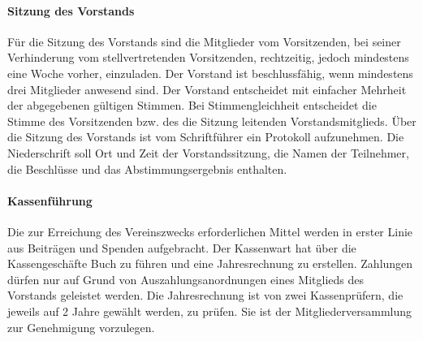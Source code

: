 \begin{multicols}{2}
\paragraph{Sitzung des Vorstands}
Für die Sitzung des Vorstands sind die Mitglieder vom Vorsitzenden, bei
seiner Verhinderung vom stellvertretenden Vorsitzenden, rechtzeitig, jedoch
mindestens eine Woche vorher, einzuladen. Der Vorstand ist
beschlussfähig, wenn mindestens drei Mitglieder anwesend sind. Der
Vorstand entscheidet mit einfacher Mehrheit der abgegebenen gültigen
Stimmen. Bei Stimmengleichheit entscheidet die Stimme des Vorsitzenden
bzw. des die Sitzung leitenden Vorstandsmitglieds. Über die Sitzung des
Vorstands ist vom Schriftführer ein Protokoll aufzunehmen. Die
Niederschrift soll Ort und Zeit der Vorstandssitzung, die Namen der
Teilnehmer, die Beschlüsse und das Abstimmungsergebnis enthalten.

\paragraph{Kassenführung}
Die zur Erreichung des Vereinszwecks erforderlichen Mittel werden in
erster Linie aus Beiträgen und Spenden aufgebracht. Der Kassenwart hat
über die Kassengeschäfte Buch zu führen und eine Jahresrechnung zu
erstellen. Zahlungen dürfen nur auf Grund von Auszahlungsanordnungen
eines Mitglieds des Vorstands geleistet werden. Die Jahresrechnung ist von
zwei Kassenprüfern, die jeweils auf 2 Jahre gewählt werden, zu prüfen. Sie
ist der Mitgliederversammlung zur Genehmigung vorzulegen.


\end{multicols}
